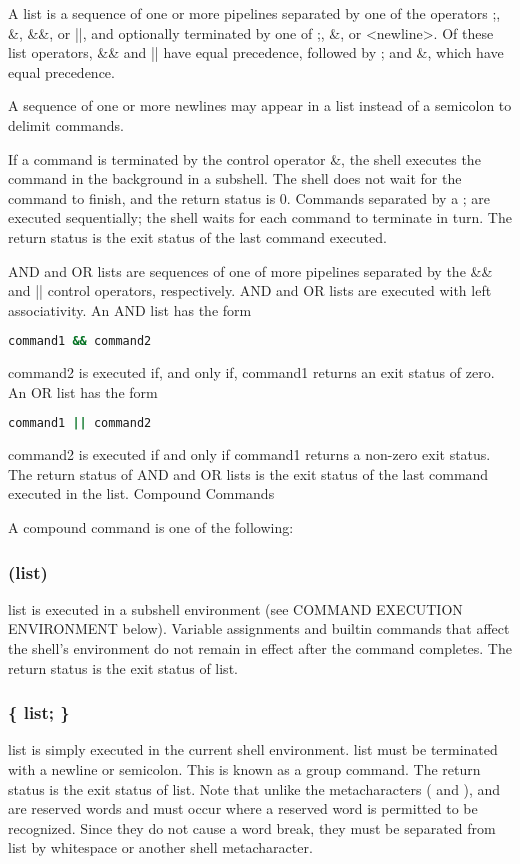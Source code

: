 \documentclass[11pt]{article}
\begin{document}
A list is a sequence of one or more pipelines separated by one of the operators ;, \&, \&\&, or ||, and optionally terminated by one of ;, \&, or <newline>.
Of these list operators, \&\& and || have equal precedence, followed by ; and \&, which have equal precedence.

A sequence of one or more newlines may appear in a list instead of a semicolon to delimit commands.

If a command is terminated by the control operator \&, the shell executes the command in the background in a subshell. The shell does not wait for the command to finish, and the return status is 0. Commands separated by a ; are executed sequentially; the shell waits for each command to terminate in turn. The return status is the exit status of the last command executed.

AND and OR lists are sequences of one of more pipelines separated by the \&\& and || control operators, respectively. AND and OR lists are executed with left associativity. An AND list has the form

\begin{lstlisting}[language=bash]
  command1 && command2
\end{lstlisting}
command2 is executed if, and only if, command1 returns an exit status of zero.
An OR list has the form

\begin{lstlisting}[language=bash]
  command1 || command2
\end{lstlisting}
command2 is executed if and only if command1 returns a non-zero exit status. The return status of AND and OR lists is the exit status of the last command executed in the list.
Compound Commands

A compound command is one of the following:
\subsubsection*{(list)}
list is executed in a subshell environment (see COMMAND EXECUTION ENVIRONMENT below). Variable assignments and builtin commands that affect the shell's environment do not remain in effect after the command completes. The return status is the exit status of list.

\subsubsection*{\{ list; \}}
list is simply executed in the current shell environment. list must be terminated with a newline or semicolon. This is known as a group command. The return status is the exit status of list. Note that unlike the metacharacters ( and ), { and } are reserved words and must occur where a reserved word is permitted to be recognized. Since they do not cause a word break, they must be separated from list by whitespace or another shell metacharacter.
\end{document}
